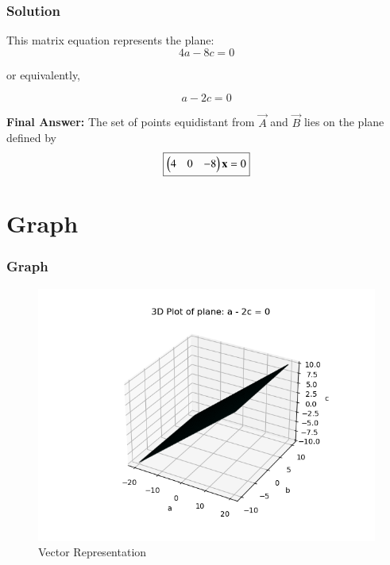 \documentclass{beamer}
\numberwithin{equation}{section}
\begin{document}
\begin{frame}[fragile]
    \frametitle{Solution}
This matrix equation represents the plane:
\[
4a - 8c = 0
\]

or equivalently,

\[
a - 2c = 0
\]

\textbf{Final Answer:} The set of points equidistant from \(\vec{A}\) and \(\vec{B}\) lies on the plane defined by
\[
\boxed{
\begin{pmatrix}4 & 0 & -8\end{pmatrix} \mathbf{x} = 0
}
\]


\end{frame}
\section{Graph}
\begin{frame}
    \frametitle{Graph}
    \begin{figure}[htbp]
    \centering
    \includegraphics[width=0.65\linewidth]{FIG/fig1.png}
    \caption{Vector Representation}
    \label{fig:FIG/fig1.png}
\end{figure}
\end{frame}
\end{document}
